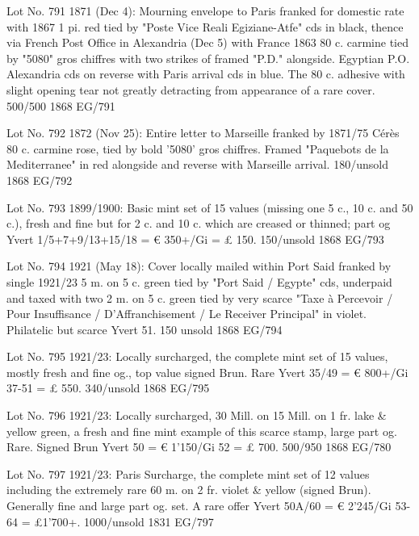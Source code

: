 \documentclass[justified]{tufte-book}
\begin{document}
%
{Lot No. 791
1871 (Dec 4): Mourning envelope to Paris franked for domestic rate with 1867 1 pi. red tied by "Poste Vice Reali Egiziane-Atfe" cds in black, thence via French Post Office in Alexandria (Dec 5) with France 1863 80 c. carmine tied by "5080" gros chiffres with two strikes of framed "P.D." alongside. Egyptian P.O. Alexandria cds on reverse with Paris arrival cds in blue. The 80 c. adhesive with slight opening tear not greatly detracting from appearance of a rare cover.
500/500
}%
{1868}%
{EG/791}%
{}%
{}
{}%
{}

%
{Lot No. 792
1872 (Nov 25): Entire letter to Marseille franked by 1871/75 Cérès 80 c. carmine rose, tied by bold '5080' gros chiffres. Framed "Paquebots de la Mediterranee" in red alongside and reverse with Marseille arrival.  180/unsold
}%
{1868}%
{EG/792}%
{}%
{}
{}%
{}

%
{Lot No. 793
1899/1900: Basic mint set of 15 values (missing one 5 c., 10 c. and 50 c.), fresh and fine but for 2 c. and 10 c. which are creased or thinned; part og Yvert 1/5+7+9/13+15/18 = € 350+/Gi = £ 150. 150/unsold
}%
{1868}%
{EG/793}%
{}%
{}
{}%
{}

%
{Lot No. 794
1921 (May 18): Cover locally mailed within Port Said franked by single 1921/23 5 m. on 5 c. green tied by "Port Said / Egypte" cds, underpaid and taxed with two 2 m. on 5 c. green tied by very scarce "Taxe à Percevoir / Pour Insuffisance / D'Affranchisement / Le Receiver Principal" in violet. Philatelic but scarce Yvert 51. 150 unsold
}%
{1868}%
{EG/794}%
{}%
{}
{}%
{}

%
{
Lot No. 795
1921/23: Locally surcharged, the complete mint set of 15 values, mostly fresh and fine og., top value signed Brun. Rare Yvert 35/49 = € 800+/Gi 37-51 = £ 550. 340/unsold
}%
{1868}%
{EG/795}%
{}%
{}
{}%
{}


%
{Lot No. 796
1921/23: Locally surcharged, 30 Mill. on 15 Mill. on 1 fr. lake \& yellow green, a fresh and fine mint example of this scarce stamp, large part og. Rare. Signed Brun Yvert 50 = € 1'150/Gi 52 = £ 700. 500/950
}%
{1868}%
{EG/780}%
{}%
{}
{}%
{}




%
{Lot No. 797
1921/23: Paris Surcharge, the complete mint set of 12 values including the extremely rare 60 m. on 2 fr. violet \& yellow (signed Brun).  Generally fine and large part og. set. A rare offer Yvert 50A/60 = € 2'245/Gi 53-64 = £1'700+.
1000/unsold}%
{1831}%
{EG/797}%
{}%
{}
{}%
{}
\end{document}
